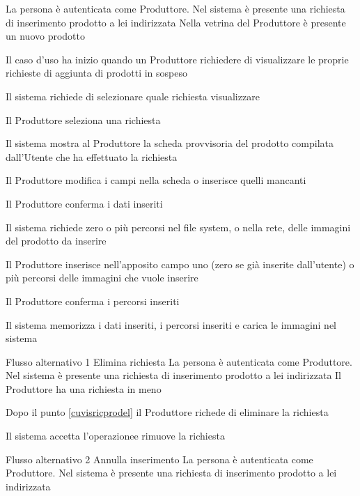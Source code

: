 {}
{La persona è autenticata come Produttore. Nel sistema è presente una richiesta di inserimento prodotto a lei indirizzata}
{Nella vetrina del Produttore è presente un nuovo prodotto}
{\begin{enumCU}
		\item Il caso d'uso ha inizio quando un Produttore richiedere di visualizzare le proprie richieste di aggiunta di prodotti in sospeso
		\item Il sistema richiede di selezionare quale richiesta visualizzare
		\item Il Produttore seleziona una richiesta
		\item Il sistema mostra al Produttore la scheda provvisoria del prodotto compilata dall'Utente che ha effettuato la richiesta \label{cuvisricprodel}
		\item Il Produttore modifica i campi nella scheda o inserisce quelli mancanti \label{cuvisricpro:1}
		\item Il Produttore conferma i dati inseriti
		\item Il sistema richiede zero o più percorsi nel file system, o nella rete, delle immagini del prodotto da inserire
		\item Il Produttore inserisce nell'apposito campo uno (zero se già inserite dall'utente) o più percorsi delle immagini che vuole inserire \label{cuvisricpro:2}
		\item Il Produttore conferma i percorsi inseriti \label{cuvisricpro:3}
		\item Il sistema memorizza i dati inseriti, i percorsi inseriti e carica le immagini nel sistema
	\end{enumCU}}
%
{Flusso alternativo 1}%
{Elimina richiesta}%
{La persona è autenticata come Produttore. Nel sistema è presente una richiesta di inserimento prodotto a lei indirizzata}
{Il Produttore ha una richiesta in meno}%
{\begin{enumCU}
		\item Dopo il punto \ref{cuvisricprodel} il Produttore richede di eliminare la richiesta
		\item Il sistema accetta l'operazionee rimuove la richiesta
	\end{enumCU}}%
%
{Flusso alternativo 2}%
{Annulla inserimento}%
{La persona è autenticata come Produttore. Nel sistema è presente una richiesta di inserimento prodotto a lei indirizzata}
{\postNulle}%
